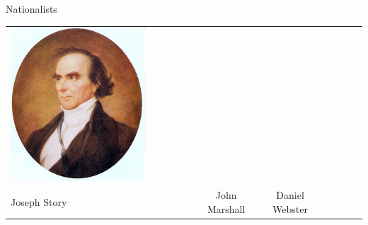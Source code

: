 \begin{frame}{Nationalists}
\begin{table}[h]
\begin{tabular}{lcccccc}
    \includegraphics[width=0.75\textwidth,height=.3\textheight,keepaspectratio=true]{img/daniel-webster-portrait.png} \\
    Joseph Story &
    John Marshall &
    Daniel Webster &
\end{tabular}
\end{table}
\end{frame}

